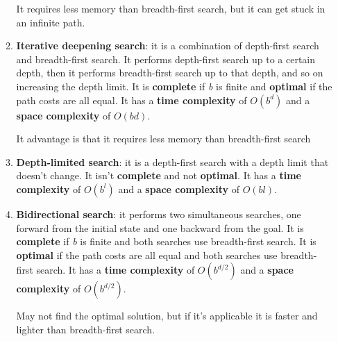 \documentclass[12pt]{article}
\begin{document}
\begin{enumerate}[label=\textbf{US.\arabic*}]
\begin{enumerate}
        It requires less memory than breadth-first search, but it can get stuck in an infinite path.

        \item \textbf{Iterative deepening search}: it is a combination of depth-first search and breadth-first search.
        It performs depth-first search up to a certain depth, then it performs breadth-first search up to that depth, 
        and so on increasing the depth limit.        
        It is \textbf{complete} if \textit{b} is finite and \textbf{optimal} if the path costs are all equal.
        It has a \textbf{time complexity} of $O(b^d)$ and a \textbf{space complexity} of $O(bd)$.

        It advantage is that it requires less memory than breadth-first search

        \item \textbf{Depth-limited search}: it is a depth-first search with a depth limit that doesn't change.
        It isn't \textbf{complete} and not \textbf{optimal}.
        It has a \textbf{time complexity} of $O(b^l)$ and a \textbf{space complexity} of $O(bl)$.

        \item \textbf{Bidirectional search}: it performs two simultaneous searches, one forward from the initial state and one backward from the goal.
        It is \textbf{complete} if \textit{b} is finite and  both searches use breadth-first search.
        It is \textbf{optimal} if the path costs are all equal and both searches use breadth-first search.
        It has a \textbf{time complexity} of $O(b^{d/2})$ and a \textbf{space complexity} of $O(b^{d/2})$.

        May not find the optimal solution, but if it's applicable it is faster and lighter than breadth-first search.

    \end{enumerate}
    
\end{enumerate}
\end{document}
